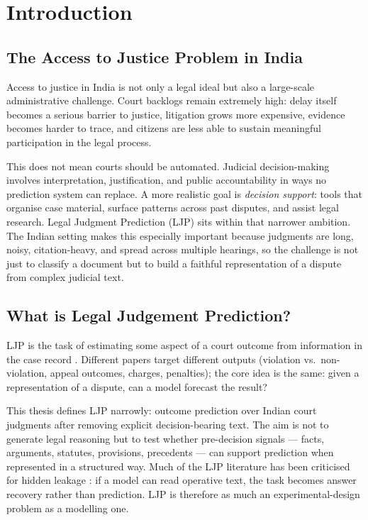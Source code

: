 \chapter{Introduction}

\section{The Access to Justice Problem in India}

Access to justice in India is not only a legal ideal but also a large-scale administrative challenge. Court backlogs remain extremely high: delay itself becomes a serious barrier to justice, litigation grows more expensive, evidence becomes harder to trace, and citizens are less able to sustain meaningful participation in the legal process.

This does not mean courts should be automated. Judicial decision-making involves interpretation, justification, and public accountability in ways no prediction system can replace. A more realistic goal is \emph{decision support}: tools that organise case material, surface patterns across past disputes, and assist legal research. Legal Judgment Prediction (LJP) sits within that narrower ambition. The Indian setting makes this especially important because judgments are long, noisy, citation-heavy, and spread across multiple hearings, so the challenge is not just to classify a document but to build a faithful representation of a dispute from complex judicial text.

\section{What is Legal Judgement Prediction?}

LJP is the task of estimating some aspect of a court outcome from information in the case record \cite{aletras2016echr, katz2017supreme, medvedeva2020echr}. Different papers target different outputs (violation vs.\ non-violation, appeal outcomes, charges, penalties); the core idea is the same: given a representation of a dispute, can a model forecast the result?

This thesis defines LJP narrowly: outcome prediction over Indian court judgments after removing explicit decision-bearing text. The aim is not to generate legal reasoning but to test whether pre-decision signals --- facts, arguments, statutes, provisions, precedents --- can support prediction when represented in a structured way. Much of the LJP literature has been criticised for hidden leakage \cite{medvedeva2023doitright}: if a model can read operative text, the task becomes answer recovery rather than prediction. LJP is therefore as much an experimental-design problem as a modelling one.

